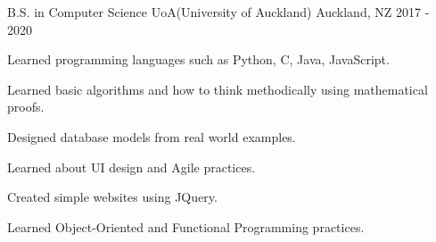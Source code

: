 

\begin{cventries}

  \cventry
    {B.S. in Computer Science} %
    {UoA(University of Auckland)} %
    {Auckland, NZ} %
    {2017 - 2020} %
    {
      \begin{cvitems} %
        \item {Learned programming languages such as Python, C, Java, JavaScript.}
        \item {Learned basic algorithms and how to think methodically using mathematical proofs.}
        \item {Designed database models from real world examples.}
        \item {Learned about UI design and Agile practices.}
        \item {Created simple websites using JQuery.}
        \item {Learned Object-Oriented and Functional Programming practices.}
      \end{cvitems}
    }

\end{cventries}

